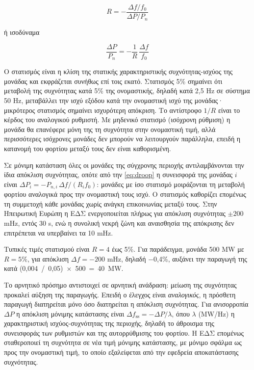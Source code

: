 \begin{equation}
R = -\frac{\Delta f / f_0}{\Delta P / P_n}
\label{eq:droopdef}
\end{equation}

ή ισοδύναμα

\begin{equation}
\frac{\Delta P}{P_n} = -\frac{1}{R}\,\frac{\Delta f}{f_0}
\label{eq:droop}
\end{equation}

Ο στατισμός είναι η κλίση της στατικής χαρακτηριστικής συχνότητας-ισχύος της μονάδας και
εκφράζεται συνήθως επί τοις εκατό. Στατισμός 5\% σημαίνει ότι μεταβολή της συχνότητας κατά 5\%
της ονομαστικής, δηλαδή κατά 2,5 Hz σε σύστημα 50 Hz, μεταβάλλει την ισχύ εξόδου κατά την
ονομαστική ισχύ της μονάδας· μικρότερος στατισμός σημαίνει ισχυρότερη απόκριση. Το αντίστροφο
$1/R$ είναι το κέρδος του αναλογικού ρυθμιστή. Με μηδενικό στατισμό (ισόχρονη ρύθμιση) η
μονάδα θα επανέφερε μόνη της τη συχνότητα στην ονομαστική τιμή, αλλά περισσότερες ισόχρονες
μονάδες δεν μπορούν να λειτουργούν παράλληλα, επειδή η κατανομή του φορτίου μεταξύ τους δεν
είναι καθορισμένη.

Σε μόνιμη κατάσταση όλες οι μονάδες της σύγχρονης περιοχής αντιλαμβάνονται την ίδια
απόκλιση συχνότητας, οπότε από την \eqref{eq:droop} η συνεισφορά της μονάδας $i$ είναι
$\Delta P_i = -P_{n,i}\,\Delta f / (R_i f_0)$: μονάδες με ίσο στατισμό μοιράζονται τη
μεταβολή φορτίου αναλογικά προς την ονομαστική τους ισχύ. Ο στατισμός καθορίζει επομένως τη
συμμετοχή κάθε μονάδας χωρίς ανάγκη επικοινωνίας μεταξύ τους. Στην Ηπειρωτική Ευρώπη η ΕΔΣ
ενεργοποιείται πλήρως για απόκλιση συχνότητας $\pm 200$ mHz, εντός 30 s, ενώ η συνολική νεκρή
ζώνη και αναισθησία της απόκρισης δεν επιτρέπεται να υπερβαίνει τα 10 mHz.

Τυπικές τιμές στατισμού είναι $R = 4$ έως 5\%. Για παράδειγμα, μονάδα 500 MW με $R = 5\%$,
για απόκλιση $\Delta f = -200$ mHz, δηλαδή −0,4\%, αυξάνει την παραγωγή της κατά
(0,004~/~0,05)~×~500~=~40~MW.

Το αρνητικό πρόσημο αντιστοιχεί σε αρνητική ανάδραση: μείωση της συχνότητας προκαλεί αύξηση
της παραγωγής. Επειδή ο έλεγχος είναι \emph{αναλογικός}, η πρόσθετη παραγωγή διατηρείται μόνο
όσο διατηρείται η απόκλιση συχνότητας. Για ανισορροπία $\Delta P$ η απόκλιση μόνιμης
κατάστασης είναι $\Delta f_{\mathrm{ss}} = -\Delta P / \lambda$, όπου $\lambda$ (MW/Hz) η
χαρακτηριστική ισχύος-συχνότητας της περιοχής, δηλαδή το άθροισμα της συνεισφοράς των
ρυθμιστών και της αυτορρύθμισης του φορτίου. Η ΕΔΣ επομένως σταθεροποιεί τη συχνότητα σε
νέα τιμή μόνιμης κατάστασης, με μόνιμο σφάλμα ως προς την ονομαστική τιμή, το οποίο
εξαλείφεται από την εφεδρεία αποκατάστασης συχνότητας.

